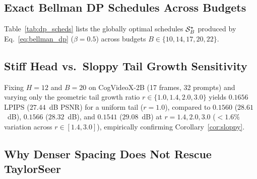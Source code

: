 \subsection{Exact Bellman DP Schedules Across Budgets}
\label{app:dp_schedules}

Table~\ref{tab:dp_scheds} lists the globally optimal schedules $\mathcal{S}_B^\star$ produced by Eq.~\eqref{eq:bellman_dp} ($\beta = 0.5$) across budgets $B \in \{10, 14, 17, 20, 22\}$.

\begin{table}[ht]
\centering\footnotesize\setlength{\tabcolsep}{3.4pt}
\caption{\textbf{Exact Bellman DP schedules ($\beta = 0.5$) vs.\ quantized KKT head lengths} across call budgets $B$ at $T=50$.}
\label{tab:dp_scheds}
\end{table}

\subsection{Stiff Head vs.\ Sloppy Tail Growth Sensitivity}
\label{app:shape}
Fixing $H = 12$ and $B = 20$ on CogVideoX-2B (17 frames, 32 prompts) and varying only the geometric tail growth ratio $r \in \{1.0, 1.4, 2.0, 3.0\}$ yields $0.1656$ LPIPS ($27.44$~dB PSNR) for a uniform tail ($r=1.0$), compared to $0.1560$ ($28.61$~dB), $0.1566$ ($28.32$~dB), and $\mathbf{0.1541}$ ($29.08$~dB) at $r = 1.4, 2.0, 3.0$ ($<1.6\%$ variation across $r \in [1.4, 3.0]$), empirically confirming Corollary~\ref{cor:sloppy}.

\subsection{Why Denser Spacing Does Not Rescue TaylorSeer}
\label{app:taylor}

